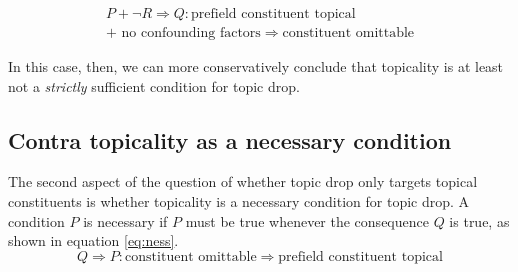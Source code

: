 \begin{equation}\label{eq:suff.nonstrict}
\begin{aligned}
P + \neg R \Rightarrow Q: \text{prefield constituent topical} \\ + \text{ no confounding factors} \Rightarrow \text{constituent omittable}
\end{aligned}
\end{equation}

\noindent
In this case, then, we can more conservatively conclude that topicality is at least not a \emph{strictly} sufficient condition for topic drop.

\subsection{Contra topicality as a necessary condition}\label{sec:topicality.ness}
The second aspect of the question of whether topic drop only targets topical constituents is whether topicality is a necessary condition for topic drop.
A condition $P$ is necessary if $P$ must be true whenever the consequence $Q$ is true, as shown in equation \ref{eq:ness}.
\begin{equation}\label{eq:ness}
Q \Rightarrow P : \text{constituent omittable} \Rightarrow  \text{prefield constituent topical}
\end{equation}

